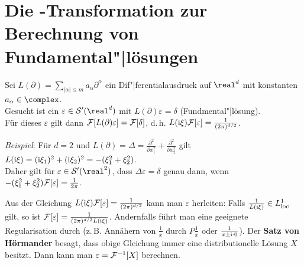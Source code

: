 \section{%
    Die -Transformation zur Berechnung von Fundamental"|lösungen%
}

Sei $L(\partial) = \sum_{|\alpha| \le m} a_\alpha \partial^\alpha$ ein
Dif"|ferentialausdruck auf $\real^d$ mit konstanten $a_\alpha \in \complex$.\\
Gesucht ist ein $\varepsilon \in \S'(\real^d)$ mit
$L(\partial)\varepsilon = \delta$ (Fundmental"|lösung).\\
Für dieses $\varepsilon$ gilt dann $\mathcal{F}[L(\partial)\varepsilon] = \mathcal{F}[\delta]$,
d.\,h. $L(\mathrm{i}\xi) \mathcal{F}[\varepsilon] = \frac{1}{(2\pi)^{d/2}}$.

\emph{Beispiel}:
Für $d = 2$ und $L(\partial) = \Delta = \frac{\partial^2}{\partial x_1^2} +
\frac{\partial^2}{\partial x_2^2}$ gilt
$L(\mathrm{i}\xi) = (\mathrm{i}\xi_1)^2 + (\mathrm{i}\xi_2)^2 = -(\xi_1^2 + \xi_2^2)$.\\
Daher gilt für $\varepsilon \in \S'(\real^2)$, dass
$\Delta \varepsilon = \delta$ genau dann, wenn
$-(\xi_1^2 + \xi_2^2) \mathcal{F}[\varepsilon] = \frac{1}{2\pi}$.

Aus der Gleichung $L(\mathrm{i}\xi) \mathcal{F}[\varepsilon] = \frac{1}{(2\pi)^{d/2}}$
kann man $\varepsilon$ herleiten:
Falls $\frac{1}{L(\mathrm{i}\xi)} \in L^1_{{\operatorname{loc}}}$ gilt, so ist
$\mathcal{F}[\varepsilon] = \frac{1}{(2\pi)^{d/2} L(\mathrm{i}\xi)}$.
Andernfalls führt man eine geeignete Regularisation durch
(z.\,B. Annähern von $\frac{1}{x}$ durch $P\frac{1}{x}$ oder
$\frac{1}{x \pm \mathrm{i} \cdot 0}$).
Der \textbf{Satz von Hörmander} besagt, dass
obige Gleichung immer eine distributionelle Lösung $X$ besitzt.
Dann kann man $\varepsilon = \mathcal{F}^{-1}[X]$ berechnen.

\linie

